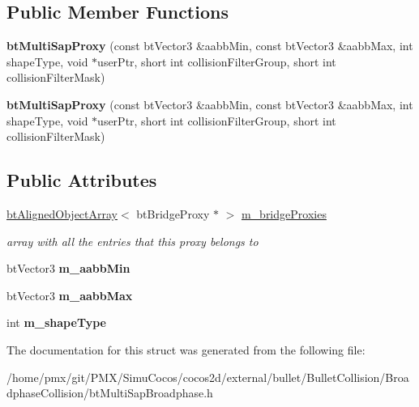 \subsection*{Public Member Functions}
\begin{DoxyCompactItemize}
\item 
\mbox{\label{structbtMultiSapBroadphase_1_1btMultiSapProxy_ace066c7cff3ec890a609ac5cb82718d0}} 
{\bfseries bt\+Multi\+Sap\+Proxy} (const bt\+Vector3 \&aabb\+Min, const bt\+Vector3 \&aabb\+Max, int shape\+Type, void $\ast$user\+Ptr, short int collision\+Filter\+Group, short int collision\+Filter\+Mask)
\item 
\mbox{\label{structbtMultiSapBroadphase_1_1btMultiSapProxy_ace066c7cff3ec890a609ac5cb82718d0}} 
{\bfseries bt\+Multi\+Sap\+Proxy} (const bt\+Vector3 \&aabb\+Min, const bt\+Vector3 \&aabb\+Max, int shape\+Type, void $\ast$user\+Ptr, short int collision\+Filter\+Group, short int collision\+Filter\+Mask)
\end{DoxyCompactItemize}
\subsection*{Public Attributes}
\begin{DoxyCompactItemize}
\item 
\mbox{\label{structbtMultiSapBroadphase_1_1btMultiSapProxy_a3586fd1c5d6772d44c43a90db1950f54}} 
\hyperlink{classbtAlignedObjectArray}{bt\+Aligned\+Object\+Array}$<$ bt\+Bridge\+Proxy $\ast$ $>$ \hyperlink{structbtMultiSapBroadphase_1_1btMultiSapProxy_a3586fd1c5d6772d44c43a90db1950f54}{m\+\_\+bridge\+Proxies}
\begin{DoxyCompactList}\small\item\em array with all the entries that this proxy belongs to \end{DoxyCompactList}\item 
\mbox{\label{structbtMultiSapBroadphase_1_1btMultiSapProxy_a3b295f71a367a02835947deb6e7ab420}} 
bt\+Vector3 {\bfseries m\+\_\+aabb\+Min}
\item 
\mbox{\label{structbtMultiSapBroadphase_1_1btMultiSapProxy_afef1b4b0aa785503e897cd98d2e7edb4}} 
bt\+Vector3 {\bfseries m\+\_\+aabb\+Max}
\item 
\mbox{\label{structbtMultiSapBroadphase_1_1btMultiSapProxy_a03bffba0e486df8d68fb43005cbe4587}} 
int {\bfseries m\+\_\+shape\+Type}
\end{DoxyCompactItemize}


The documentation for this struct was generated from the following file\+:\begin{DoxyCompactItemize}
\item 
/home/pmx/git/\+P\+M\+X/\+Simu\+Cocos/cocos2d/external/bullet/\+Bullet\+Collision/\+Broadphase\+Collision/bt\+Multi\+Sap\+Broadphase.\+h\end{DoxyCompactItemize}
